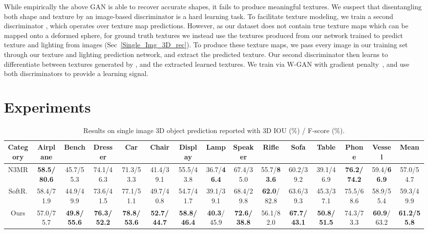 \documentclass{article}
\begin{document}
\begin{minipage}[t] {0.09\textwidth}
While empirically the above GAN is able to recover accurate shapes, it fails to produce meaningful textures. We suspect that disentangling both shape and texture by an image-based discriminator is a hard learning task. To facilitate texture modeling, we train a second discriminator , which operates over texture map predictions. However, as our dataset does not contain true texture maps which can be mapped onto a deformed sphere, for ground truth textures we instead use the textures produced from our network trained to predict texture and lighting from images (Sec~\ref{Single_Img_3D_rec}). To produce these texture maps, we pass every image in our training set through our texture and lighting prediction network, and extract the predicted texture. Our second discriminator then learns to differentiate between textures generated by , and the extracted learned textures. We train  via W-GAN with gradient penalty~\cite{gulrajani2017improved}, and use both discriminators to provide a learning signal.   



\vspace{-6pt}
\section{Experiments}
\vspace{-10pt}
\begin{table}[t!]
\vspace{-3mm}
	\begin{center}
	{
	\caption{Results on single image 3D object prediction reported with 3D IOU (\%) / F-score (\%).}
\label{tbl:3diou}
		\begin{adjustbox}{width=1.01\linewidth}
		\addtolength{\tabcolsep}{-3.9pt}
		\hspace{-4mm}\begin{tabular}{c|c|c|c|c|c|c|c|c|c|c|c|c|c|c}
			\toprule
		    Category & Airplane & Bench & Dresser & Car & Chair &Display &Lamp & Speaker & Rifle & Sofa & Table & Phone & Vessel & Mean\\
		    \toprule
		    N3MR~\cite{NMR} &\textbf{ 58.5/80.6}&45.7/55.3&74.1/46.3&71.3/53.3&41.4/39.1&55.5/43.8&36.7/\textbf{46.4}&67.4/35.0&55.7/\textbf{83.6} & 60.2/39.2 & 39.1/46.9 & \textbf{76.2/74.2} & 59.4/\textbf{66.9} & 57.0/54.7\\
			SoftR.~\cite{liu2019soft} &58.4/71.9&44.9/49.9&73.6/41.5&77.1/51.1&49.7/40.8&54.7/41.7&39.1/39.1&68.4/29.8& \textbf{62.0}/82.8 & 63.6/39.3 & 45.3/37.1 & 75.5/68.6 & 58.9/55.4 & 59.3/49.9\\
Ours &57.0/75.7&\textbf{49.8/55.6}&\textbf{76.3/52.2}&\textbf{78.8/53.6}&\textbf{52.7/44.7}&\textbf{58.8/46.4}&\textbf{40.3}/45.9&\textbf{72.6/38.8}&56.1/82.0 & \textbf{67.7/43.1} & \textbf{50.8/51.5} & 74.3/73.3 &  \textbf{60.9}/63.2 & \textbf{61.2/55.8}\\
			\bottomrule
		\end{tabular}
		\end{adjustbox}
		}
	\end{center}
	\vspace{-6mm}
\end{table}


\end{minipage}
\end{document}

